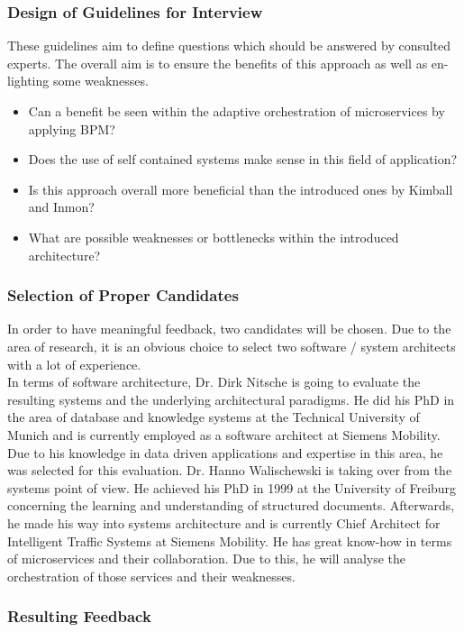 \subsubsection{Design of Guidelines for Interview}
These guidelines aim to define questions which should be answered by consulted experts. The overall aim is to ensure the benefits of this approach as well as en-lighting some weaknesses. 
\begin{itemize}
    \item Can a benefit be seen within the adaptive orchestration of microservices by applying BPM?
    \item Does the use of self contained systems make sense in this field of application?
    \item Is this approach overall more beneficial than the introduced ones by Kimball and Inmon?
    \item What are possible weaknesses or bottlenecks within the introduced architecture?
\end{itemize}

\subsubsection{Selection of Proper Candidates}
In order to have meaningful feedback, two candidates will be chosen. Due to the area of research, it is an obvious choice to select two software / system architects with a lot of experience.\newline
\\
In terms of software architecture, Dr. Dirk Nitsche is going to evaluate the resulting systems and the underlying architectural paradigms. He did his PhD in the area of database and knowledge systems at the Technical University of Munich and is currently employed as a software architect at Siemens Mobility. Due to his knowledge in data driven applications and expertise in this area, he was selected for this evaluation.\newline
Dr. Hanno Walischewski is taking over from the systems point of view. He achieved his PhD in 1999 at the University of Freiburg concerning the learning and understanding of structured documents. Afterwards, he made his way into systems architecture and is currently Chief Architect for Intelligent Traffic Systems at Siemens Mobility. He has great know-how in terms of microservices and their collaboration. Due to this, he will analyse the orchestration of those services and their weaknesses.  

\subsubsection{Resulting Feedback}
\cite{dirk}
\cite{hanno}